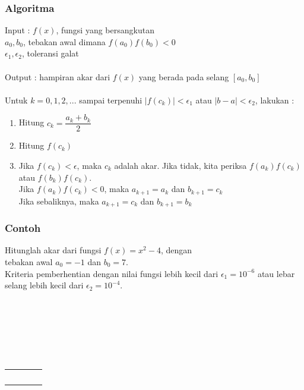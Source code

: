 \documentclass{beamer}
\begin{document}

\begin{frame}
\frametitle{Algoritma}
Input : $f(x)$, fungsi yang bersangkutan
\\\quad \qquad $a_0,b_0$, tebakan awal dimana $f(a_0)f(b_0)<0$
\\\quad \qquad $\epsilon_1,\epsilon_2$, toleransi galat
\\\ \\Output : hampiran akar dari $f(x)$ yang berada pada selang $[a_0,b_0]$
\\\ \\Untuk $k=0,1,2, ...$ sampai terpenuhi $|f(c_k)|<\epsilon_1$ atau $|b-a|<\epsilon_2$, lakukan :
\begin{enumerate}
\item Hitung $c_k = \dfrac{a_k+b_k}{2}$
\item Hitung $f(c_k)$
\item Jika $f(c_k)<\epsilon$, maka $c_k$ adalah akar. Jika tidak, kita periksa $f(a_k)f(c_k)$ atau $f(b_k)f(c_k)$. \\Jika $f(a_k)f(c_k)<0$, maka $a_{k+1}=a_k$ dan $b_{k+1}=c_k$
\\Jika sebaliknya, maka $a_{k+1}=c_k$ dan $b_{k+1}=b_k$
\end{enumerate} 
\end{frame}


\begin{frame}
\frametitle{Contoh}
Hitunglah akar dari fungsi $f(x)=x^2-4$, dengan \\tebakan awal $a_0=-1$ dan $b_0=7$. \\Kriteria pemberhentian dengan nilai fungsi lebih kecil dari $\epsilon_1 = 10^{-6}$ atau lebar selang lebih kecil dari $\epsilon_2 = 10^{-4}$.
\\\ \\\ \\\ \\\ \\\ \\\ \\
\begin{tabular}{llll}
\\
\
\end{tabular}
\\\ \\\
\\\ \\
\end{frame}
\end{document}
